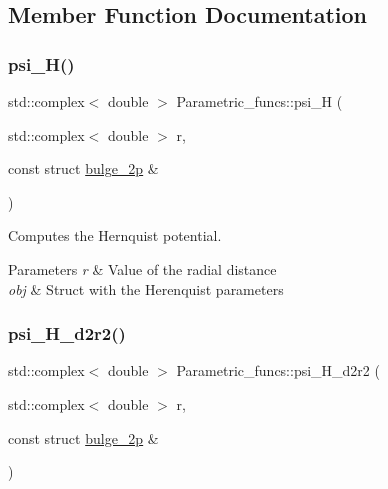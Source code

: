 \subsection{Member Function Documentation}
\mbox{\label{classParametric__funcs_a4ef64b9bbc8c109f4e3986bb425342f3}} 
\subsubsection{\texorpdfstring{psi\+\_\+\+H()}{psi\_H()}}
{\footnotesize\ttfamily std\+::complex$<$ double $>$ Parametric\+\_\+funcs\+::psi\+\_\+H (\begin{DoxyParamCaption}\item[{std\+::complex$<$ double $>$}]{r,  }\item[{const struct \hyperlink{structbulge__2p}{bulge\+\_\+2p} \&}]{ }\end{DoxyParamCaption})\hspace{0.3cm}{\ttfamily [static]}}



Computes the Hernquist potential. 


\begin{DoxyParams}{Parameters}
{\em r} & Value of the radial distance \\
\hline
{\em obj} & Struct with the Herenquist parameters \\
\hline
\end{DoxyParams}
\mbox{\label{classParametric__funcs_a8e663fb60e664f232a5779dc107782a6}} 
\subsubsection{\texorpdfstring{psi\+\_\+\+H\+\_\+d2r2()}{psi\_H\_d2r2()}}
{\footnotesize\ttfamily std\+::complex$<$ double $>$ Parametric\+\_\+funcs\+::psi\+\_\+\+H\+\_\+d2r2 (\begin{DoxyParamCaption}\item[{std\+::complex$<$ double $>$}]{r,  }\item[{const struct \hyperlink{structbulge__2p}{bulge\+\_\+2p} \&}]{ }\end{DoxyParamCaption})\hspace{0.3cm}{\ttfamily [static]}}



